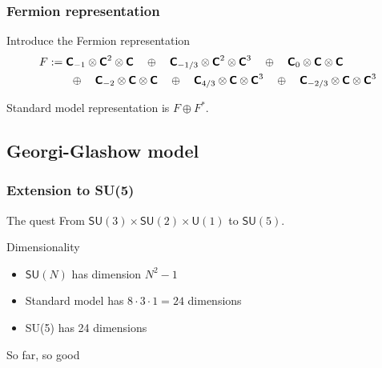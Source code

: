 \documentclass[english, fleqn]{beamer}
\begin{document}
\begin{frame}
    \frametitle{Fermion representation}

    Introduce the Fermion representation
    \begin{align*}
        F &:= 
        \text{\bfseries\sffamily{C}}_{-1} \otimes \text{\bfseries\sffamily{C}}^2 \otimes \text{\bfseries\sffamily{C}}
        \quad\oplus\quad \text{\bfseries\sffamily{C}}_{-1/3} \otimes \text{\bfseries\sffamily{C}}^2 \otimes \text{\bfseries\sffamily{C}}^3
        \quad\oplus\quad \text{\bfseries\sffamily{C}}_{0} \otimes \text{\bfseries\sffamily{C}} \otimes \text{\bfseries\sffamily{C}}
        \\&\qquad\oplus\quad \text{\bfseries\sffamily{C}}_{-2} \otimes \text{\bfseries\sffamily{C}} \otimes \text{\bfseries\sffamily{C}}
        \quad\oplus\quad \text{\bfseries\sffamily{C}}_{4/3} \otimes \text{\bfseries\sffamily{C}} \otimes \text{\bfseries\sffamily{C}}^3
        \quad\oplus\quad \text{\bfseries\sffamily{C}}_{-2/3} \otimes \text{\bfseries\sffamily{C}} \otimes \text{\bfseries\sffamily{C}}^3
    \end{align*}

    \pause

    Standard model representation is $F \oplus F^*$.
\end{frame}

\subsection{Georgi-Glashow model}

\begin{frame}
    \frametitle{Extension to SU(5)}
    \begin{block}{The quest}
        From $\mathsf{SU}(3) \times \mathsf{SU}(2) \times \mathsf U(1)$ to $\mathsf{SU}(5)$.
    \end{block}

    \begin{block}{Dimensionality}
        \begin{itemize}
            \item $\mathsf{SU}(N)$ has dimension $N^2 - 1$
            \item Standard model has $8 \cdot 3 \cdot 1 = 24$ dimensions
            \item SU(5) has 24 dimensions
        \end{itemize}

        So far, so good
    \end{block}
\end{frame}
\end{document}
